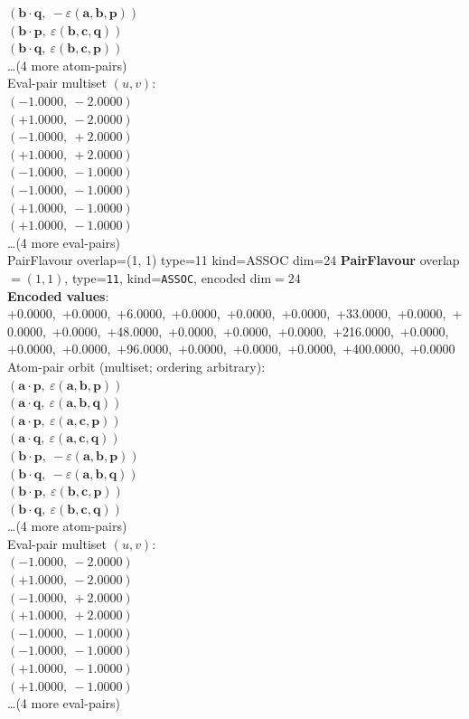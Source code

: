\documentclass[a4paper,11pt]{article}
\newcommand{\pdcegfomjfhook}[2]{\mathbf{#1} \cdot \mathbf{#2}}
\newcommand{\kblbmcpggoncpf}[3]{\varepsilon(\mathbf{#1},\mathbf{#2},\mathbf{#3})}
\begin{document}
$(\pdcegfomjfhook{b}{q},\ -\kblbmcpggoncpf{a}{b}{p})$\\
$(\pdcegfomjfhook{b}{p},\ \kblbmcpggoncpf{b}{c}{q})$\\
$(\pdcegfomjfhook{b}{q},\ \kblbmcpggoncpf{b}{c}{p})$\\
\quad \ldots (4 more atom-pairs)\\
\quad Eval-pair multiset $(u, v)$:\\
$(-1.0000,\ -2.0000)$\\
$(+1.0000,\ -2.0000)$\\
$(-1.0000,\ +2.0000)$\\
$(+1.0000,\ +2.0000)$\\
$(-1.0000,\ -1.0000)$\\
$(-1.0000,\ -1.0000)$\\
$(+1.0000,\ -1.0000)$\\
$(+1.0000,\ -1.0000)$\\
\quad \ldots (4 more eval-pairs)\\
    PairFlavour  overlap=(1, 1)  type=11  kind=ASSOC  dim=24
\textbf{PairFlavour} overlap$=(1, 1)$, type=\texttt{11}, kind=\texttt{ASSOC}, encoded dim$=24$\\
\textbf{      Encoded values}: +0.0000,\ +0.0000,\ +6.0000,\ +0.0000,\ +0.0000,\ +0.0000,\ +33.0000,\ +0.0000,\ +0.0000,\ +0.0000,\ +48.0000,\ +0.0000,\ +0.0000,\ +0.0000,\ +216.0000,\ +0.0000,\ +0.0000,\ +0.0000,\ +96.0000,\ +0.0000,\ +0.0000,\ +0.0000,\ +400.0000,\ +0.0000\\
\quad Atom-pair orbit (multiset; ordering arbitrary):\\
$(\pdcegfomjfhook{a}{p},\ \kblbmcpggoncpf{a}{b}{p})$\\
$(\pdcegfomjfhook{a}{q},\ \kblbmcpggoncpf{a}{b}{q})$\\
$(\pdcegfomjfhook{a}{p},\ \kblbmcpggoncpf{a}{c}{p})$\\
$(\pdcegfomjfhook{a}{q},\ \kblbmcpggoncpf{a}{c}{q})$\\
$(\pdcegfomjfhook{b}{p},\ -\kblbmcpggoncpf{a}{b}{p})$\\
$(\pdcegfomjfhook{b}{q},\ -\kblbmcpggoncpf{a}{b}{q})$\\
$(\pdcegfomjfhook{b}{p},\ \kblbmcpggoncpf{b}{c}{p})$\\
$(\pdcegfomjfhook{b}{q},\ \kblbmcpggoncpf{b}{c}{q})$\\
\quad \ldots (4 more atom-pairs)\\
\quad Eval-pair multiset $(u, v)$:\\
$(-1.0000,\ -2.0000)$\\
$(+1.0000,\ -2.0000)$\\
$(-1.0000,\ +2.0000)$\\
$(+1.0000,\ +2.0000)$\\
$(-1.0000,\ -1.0000)$\\
$(-1.0000,\ -1.0000)$\\
$(+1.0000,\ -1.0000)$\\
$(+1.0000,\ -1.0000)$\\
\quad \ldots (4 more eval-pairs)\\
\end{document}
